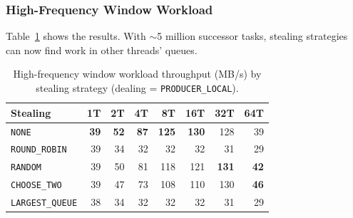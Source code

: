 \subsubsection{High-Frequency Window Workload}

Table~\ref{tab:ws-highfreq} shows the results. With $\sim$5 million successor tasks, stealing strategies can now find work in other threads' queues.

\begin{table}[h]
\centering
\caption{High-frequency window workload throughput (MB/s) by stealing strategy (dealing = \texttt{PRODUCER\_LOCAL}).}
\label{tab:ws-highfreq}
\begin{tabular}{l|rrrrrrr}
\hline
\textbf{Stealing} & \textbf{1T} & \textbf{2T} & \textbf{4T} & \textbf{8T} & \textbf{16T} & \textbf{32T} & \textbf{64T} \\
\hline
\texttt{NONE}          & \textbf{39} & \textbf{52} & \textbf{87} & \textbf{125} & \textbf{130} & 128 & 39 \\
\texttt{ROUND\_ROBIN}  & 39 & 34 & 32 & 32 & 32 & 31 & 29 \\
\texttt{RANDOM}        & 39 & 50 & 81 & 118 & 121 & \textbf{131} & \textbf{42} \\
\texttt{CHOOSE\_TWO}   & 39 & 47 & 73 & 108 & 110 & 130 & \textbf{46} \\
\texttt{LARGEST\_QUEUE}& 38 & 34 & 32 & 32 & 32 & 31 & 29 \\
\hline
\end{tabular}
\end{table}

